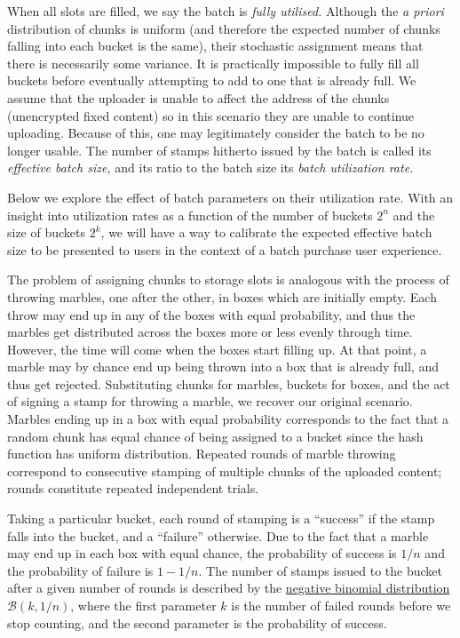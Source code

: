 When all slots are filled, we say the batch is \emph{fully utilised.} 
Although the \emph{a priori} distribution of chunks is uniform (and
therefore the expected number of chunks falling into each bucket is the
same), their stochastic assignment means that there is necessarily some variance. 
It is practically
impossible to fully fill all buckets before eventually attempting to add to one that is already full. 
We assume that the uploader is unable to
affect the address of the chunks (unencrypted fixed content) so in this scenario they are unable to
continue uploading. Because of this, one may legitimately consider the
batch to be no longer usable. The number of stamps hitherto issued by
the batch is called its \emph{effective batch size,} and its ratio to
the batch size its \emph{batch utilization rate.}

Below we explore the effect of batch parameters on their utilization
rate. With an insight into utilization rates as a function of the number
of buckets $2^n$ and the size of buckets $2^k$, we will have a way
to calibrate the expected effective batch size to be presented to users
in the context of a batch purchase user experience.

The problem of assigning chunks to storage slots is analogous with the
process of throwing marbles, one after the other, in boxes which are
initially empty. Each throw may end up in any of the boxes with equal
probability, and thus the marbles get distributed across the boxes more
or less evenly through time. However, the time will come when the boxes
start filling up. At that point, a marble may by chance end up being
thrown into a box that is already full, and thus get rejected.
Substituting chunks for marbles, buckets for boxes, and the act of
signing a stamp for throwing a marble, we recover our original scenario.
Marbles ending up in a box with equal probability corresponds to the
fact that a random chunk has equal chance of being assigned to a bucket
since the hash function has uniform distribution. Repeated rounds of
marble throwing correspond to consecutive stamping of multiple chunks of
the uploaded content; rounds constitute repeated independent trials.

Taking a particular bucket, each round of stamping is a ``success'' if
the stamp falls into the bucket, and a ``failure'' otherwise. Due to the
fact that a marble may end up in each box with equal chance, the
probability of success is $1/n$ and the probability of failure is
$1 - 1/n$. The number of stamps issued to the bucket after a given
number of rounds is described by the
\href{https://en.wikipedia.org/wiki/Negative_binomial_distribution\#Distribution_of_a_sum_of_geometrically_distributed_random_variables}{negative
binomial distribution} $\mathcal{B}(k, 1/n)$, where the first
parameter $k$ is the number of failed rounds before we stop counting,
and the second parameter is the probability of success.

